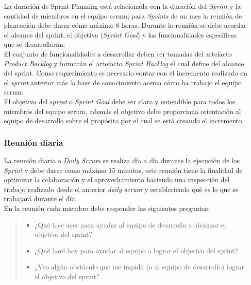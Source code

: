  \noindent La duración de Sprint Planning está relacionada con la duración del {\it Sprint} y la
 cantidad de miembros en el equipo scrum; para {\it Sprints} de un mes la reunión de planeación debe
 durar cómo máximo 8 horas. Durante la reunión se debe acordar el alcance del sprint, el objetivo
 ({\it Sprint Goal}) y las funcionalidades específicas que se desarrollarán.\\

 \noindent El conjunto de funcionalidades a desarrollar deben ser tomadas del artefacto {\it Product
 Backlog} y formarán el artefacto {\it Sprint Backlog} el cual define del alcance del sprint. Como
 requerimiento es necesario contar con el incremento realizado en el {\it sprint} anterior más la base
 de conocimiento acerca cómo ha trabajo el equipo scrum.\\



 \noindent El objetivo del {\it sprint} o {\it Sprint Goal} debe ser claro y entendible para todos los
 miembros del equipo scrum, además el objetivo debe proporciona orientación al equipo de desarrollo sobre
 el propósito por el cual se está creando el incremento.

\subsubsection{Reunión diaria}

 La reunión diaria o {\it Daily Scrum} se realiza día a día durante la ejecución de los {\it Sprint} y debe
 durar como máximo 15 minutos, este reunión tiene la finalidad de optimizar la colaboración y el aprovechamiento
 haciendo una inspección del trabajo realizado desde el anterior {\it daily scrum} y estableciendo qué es lo
 que se trabajará durante el día.\\

 En la reunión cada miembro debe responder las siguientes preguntas:

    \begin{quote}
    \begin{itemize}
    \item ¿Qué hice ayer para ayudar al equipo de desarrollo a alcanzar el objetivo del sprint?
    \item ¿Qué haré hoy para ayudar al equipo a lograr el objetivo del sprint?
    \item ¿Veo algún obstáculo que me impida (o al equipo de desarrollo) lograr el objetivo del sprint?
    \end{itemize}
    \end{quote}

